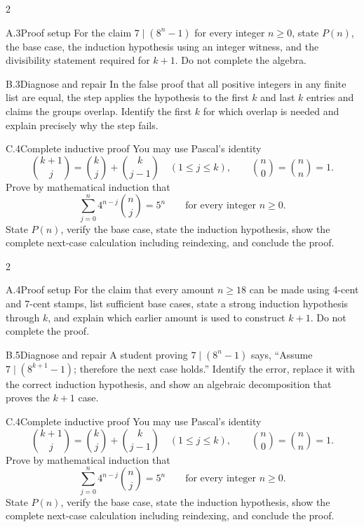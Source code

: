 \documentclass[9pt]{extarticle}
\begin{document}
\CoreWorkArea
\FormBreak
{}
\begin{multicols}{2}
\begin{CompactCoreProblem}{A.3}{Proof setup}
For the claim $7\mid(8^n-1)$ for every integer $n\ge0$, state $P(n)$, the base case, the induction hypothesis using an integer witness, and the divisibility statement required for $k+1$. Do not complete the algebra.
\end{CompactCoreProblem}
\begin{CompactCoreProblem}{B.3}{Diagnose and repair}
In the false proof that all positive integers in any finite list are equal, the step applies the hypothesis to the first $k$ and last $k$ entries and claims the groups overlap. Identify the first $k$ for which overlap is needed and explain precisely why the step fails.
\end{CompactCoreProblem}
\end{multicols}
\begin{CompactCoreProblem}{C.4}{Complete inductive proof}
You may use Pascal's identity
\[
\binom{k+1}{j}=\binom{k}{j}+\binom{k}{j-1}
\quad(1\le j\le k),\qquad
\binom{n}{0}=\binom{n}{n}=1.
\]
Prove by mathematical induction that
\[
\sum_{j=0}^{n} 4^{n-j}\binom{n}{j}=5^n\qquad\text{for every integer }n\ge0.
\]
State $P(n)$, verify the base case, state the induction hypothesis, show the complete next-case calculation including reindexing, and conclude the proof.
\end{CompactCoreProblem}
\CoreWorkArea
\FormBreak
{}
\begin{multicols}{2}
\begin{CompactCoreProblem}{A.4}{Proof setup}
For the claim that every amount $n\ge18$ can be made using 4-cent and 7-cent stamps, list sufficient base cases, state a strong induction hypothesis through $k$, and explain which earlier amount is used to construct $k+1$. Do not complete the proof.
\end{CompactCoreProblem}
\begin{CompactCoreProblem}{B.5}{Diagnose and repair}
A student proving $7\mid(8^n-1)$ says, “Assume $7\mid(8^{k+1}-1)$; therefore the next case holds.” Identify the error, replace it with the correct induction hypothesis, and show an algebraic decomposition that proves the $k+1$ case.
\end{CompactCoreProblem}
\end{multicols}
\begin{CompactCoreProblem}{C.4}{Complete inductive proof}
You may use Pascal's identity
\[
\binom{k+1}{j}=\binom{k}{j}+\binom{k}{j-1}
\quad(1\le j\le k),\qquad
\binom{n}{0}=\binom{n}{n}=1.
\]
Prove by mathematical induction that
\[
\sum_{j=0}^{n} 4^{n-j}\binom{n}{j}=5^n\qquad\text{for every integer }n\ge0.
\]
State $P(n)$, verify the base case, state the induction hypothesis, show the complete next-case calculation including reindexing, and conclude the proof.
\end{CompactCoreProblem}
\end{document}
